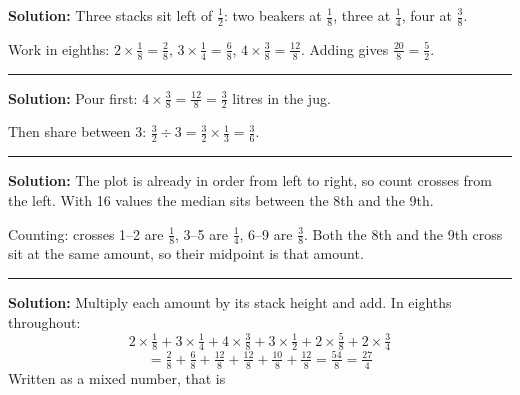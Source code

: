 \documentclass[12pt]{article}
\begin{document}

\textbf{Solution:} Three stacks sit left of $\frac{1}{2}$: two beakers at $\frac{1}{8}$, three at $\frac{1}{4}$, four at $\frac{3}{8}$.

Work in eighths: $2 \times \frac{1}{8} = \frac{2}{8}$, $3 \times \frac{1}{4} = \frac{6}{8}$, $4 \times \frac{3}{8} = \frac{12}{8}$. Adding gives $\frac{20}{8} = \frac{5}{2}$. 

\vspace{0.15cm}\noindent\rule{\linewidth}{0.2pt}\vspace{0.15cm}


\textbf{Solution:} Pour first: $4 \times \frac{3}{8} = \frac{12}{8} = \frac{3}{2}$ litres in the jug.

Then share between 3: $\frac{3}{2} \div 3 = \frac{3}{2} \times \frac{1}{3} = \frac{3}{6}$. 

\vspace{0.15cm}\noindent\rule{\linewidth}{0.2pt}\vspace{0.15cm}


\textbf{Solution:} The plot is already in order from left to right, so count crosses from the left. With 16 values the median sits between the 8th and the 9th.

Counting: crosses 1--2 are $\frac{1}{8}$, 3--5 are $\frac{1}{4}$, 6--9 are $\frac{3}{8}$. Both the 8th and the 9th cross sit at the same amount, so their midpoint is that amount. 

\vspace{0.15cm}\noindent\rule{\linewidth}{0.2pt}\vspace{0.15cm}


\textbf{Solution:} Multiply each amount by its stack height and add. In eighths throughout:
\[ 2 \times \tfrac{1}{8} + 3 \times \tfrac{1}{4} + 4 \times \tfrac{3}{8} + 3 \times \tfrac{1}{2} + 2 \times \tfrac{5}{8} + 2 \times \tfrac{3}{4} \]
\[ = \tfrac{2}{8} + \tfrac{6}{8} + \tfrac{12}{8} + \tfrac{12}{8} + \tfrac{10}{8} + \tfrac{12}{8} = \tfrac{54}{8} = \tfrac{27}{4} \]
Written as a mixed number, that is 
\end{document}
